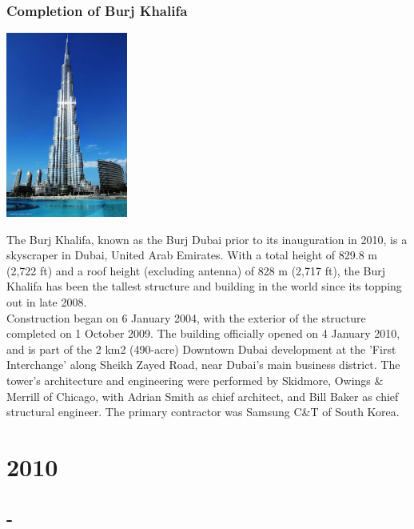 \documentclass[11pt]{report}
\begin{document}
\subsection{Completion of Burj Khalifa}
\vspace{2mm}\begin{center}\includegraphics[width=4cm]{./img/burjKhalifa.jpg}\end{center}
The Burj Khalifa, known as the Burj Dubai prior to its inauguration in 2010, is a skyscraper in Dubai, United Arab Emirates. With a total height of 829.8 m (2,722 ft) and a roof height (excluding antenna) of 828 m (2,717 ft), the Burj Khalifa has been the tallest structure and building in the world since its topping out in late 2008.\\
\indent Construction began on 6 January 2004, with the exterior of the structure completed on 1 October 2009. The building officially opened on 4 January 2010, and is part of the 2 km2 (490-acre) Downtown Dubai development at the 'First Interchange' along Sheikh Zayed Road, near Dubai's main business district. The tower's architecture and engineering were performed by Skidmore, Owings \& Merrill of Chicago, with Adrian Smith as chief architect, and Bill Baker as chief structural engineer. The primary contractor was Samsung C\&T of South Korea.

\chapter{2010}
\section{-}
\end{document}

